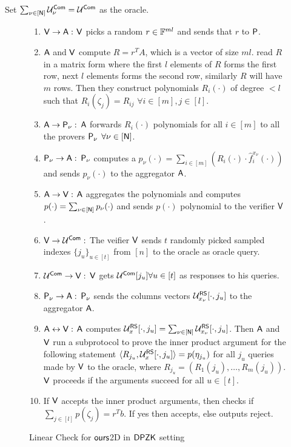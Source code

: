 Set $\sum_{\nu \in [\mathsf{N}]} \mathcal{U}^{\mathsf{Com}}_{\nu} = \mathcal{U}^{\mathsf{Com}}$ as the oracle.
\begin{figure}[h!]
\begin{framed}
\begin{enumerate}
	\item $\mathsf{V} \rightarrow \mathsf{A} : $ $\mathsf{V}$ picks a random $r\in \mathbb{F}^{ml}$ and sends that $r$ to $\mathsf{P}$.
	\item $\mathsf{A}$ and $\mathsf{V}$ compute $R=r^TA$, which is a vector of size $ml$. read $R$ in a matrix form where the first $l$ elements of $R$ forms the first row, next $l$ elements forms the second row, similarly $R$ will have $m$ rows. Then they construct polynomials $R_i(\cdot)$ of degree $<l$ such that $R_i(\zeta_j)=R_{ij}$ $\forall i\in[m], j\in[l]$.
	\item $\mathsf{A} \rightarrow \mathsf{P}_{\nu} : $ $\mathsf{A}$ forwards $R_i(\cdot)$ polynomials for all $i\in[m]$ to all the provers $\mathsf{P}_{\nu}$ $\forall \nu\in[\mathsf{N}]$.
	\item $\mathsf{P}_{\nu} \rightarrow \mathsf{A} : $ $\mathsf{P}_{\nu}$ computes a $p_{\nu}(\cdot) = \sum_{i\in[m]} (R_i(\cdot)\cdot \hat{f}^{x_{\nu}}_i(\cdot))$ and sends $p_{\nu}(\cdot)$ to the aggregator $\mathsf{A}$.
	\item $\mathsf{A} \rightarrow \mathsf{V} : $ $\mathsf{A}$ aggregates the polynomials and computes $p(\cdot)=\sum_{\nu\in[\mathsf{N}]} p_{\nu}(\cdot)$ and sends $p(\cdot)$ polynomial to the verifier $\mathsf{V}$.
	\item $\mathsf{V} \rightarrow \mathcal{U}^{\mathsf{Com}} : $ The veifier $\mathsf{V}$ sends $t$ randomly picked sampled indexes $\{j_u\}_{u\in[t]}$ from $[n]$ to the oracle as oracle query.
	\item $\mathcal{U}^{\mathsf{Com}} \rightarrow \mathsf{V} : $ $\mathsf{V}$ gets $\mathcal{U}^{\mathsf{Com}}[j_u] \forall u\in[t]$ as responses to his queries.
	\item $\mathsf{P}_{\nu} \rightarrow \mathsf{A} : $ $\mathsf{P}_{\nu}$ sends the columns vectors $\mathcal{U}^{\mathsf{RS}}_{x_{\nu}}[\cdot,j_u]$ to the aggregator $\mathsf{A}$.
	\item $\mathsf{A} \leftrightarrow \mathsf{V} : $ $\mathsf{A}$ computes $\mathcal{U}^{\mathsf{RS}}_{x}[\cdot,j_u] = \sum_{\nu \in [\mathsf{N}]} \mathcal{U}^{\mathsf{RS}}_{x_{\nu}}[\cdot, j_u]$. Then $\mathsf{A}$ and $\mathsf{V}$ run a subprotocol to prove the inner product argument for the following statement $\langle R_{j_u},\mathcal{U}^{\mathsf{RS}}_{x}[\cdot, j_u]\rangle = p(\eta_{j_u})$ for all $j_u$ queries made by $\mathsf{V}$ to the oracle, where $R_{j_u} = (R_1(j_u), \ldots, R_m(j_u))$. $\mathsf{V}$ proceeds if the arguments succeed for all $u\in[t]$.
	\item If $\mathsf{V}$ accepts the inner product arguments, then checks if $\sum_{j\in[l]} p(\zeta_j) = r^Tb$. If yes then accepts, else outputs reject.
\end{enumerate}
\end{framed}
\caption{Linear Check for $\textsf{ours}$2D in $\mathsf{DPZK}$ setting}
\end{figure}
